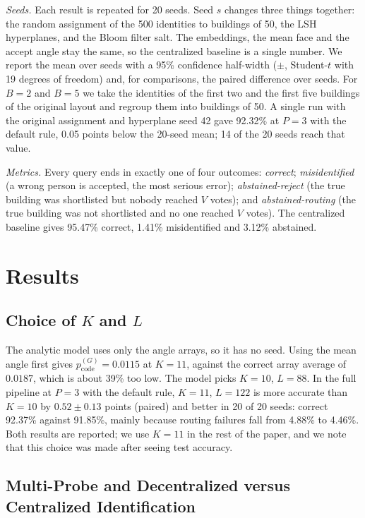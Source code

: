 \documentclass[runningheads]{llncs}
\begin{document}
\emph{Seeds.} Each result is repeated for 20 seeds. Seed $s$ changes three things together: the random assignment of
the 500 identities to buildings of 50, the LSH hyperplanes, and the Bloom filter salt. The embeddings, the mean face
and the accept angle stay the same, so the centralized baseline is a single number. We report the mean over seeds
with a 95\% confidence half-width ($\pm$, Student-$t$ with 19 degrees of freedom) and, for comparisons, the paired
difference over seeds. For $B=2$ and $B=5$ we take the identities of the first two and the first five buildings of
the original layout and regroup them into buildings of 50. A single run with the original assignment and hyperplane
seed 42 gave 92.32\% at $P=3$ with the default rule, 0.05 points below the 20-seed mean; 14
of the 20 seeds reach that value.

\emph{Metrics.} Every query ends in exactly one of four outcomes: \emph{correct}; \emph{misidentified} (a wrong
person is accepted, the most serious error); \emph{abstained-reject} (the true building was shortlisted but nobody
reached $V$ votes); and \emph{abstained-routing} (the true building was not shortlisted and no one reached $V$
votes). The centralized baseline gives 95.47\% correct, 1.41\% misidentified and 3.12\%
abstained.

\section{Results}
\label{sec:results}

\subsection{Choice of $K$ and $L$}
\label{sec:k1011}

The analytic model uses only the angle arrays, so it has no seed. Using the mean angle first gives
$p_{\text{code}}^{(G)}=0.0115$ at $K=11$, against the correct array average of $0.0187$, which is about
39\% too low. The model picks $K=10$, $L=88$. In the full pipeline at $P=3$ with the default rule, $K=11$,
$L=122$ is more accurate than $K=10$ by $0.52 \pm 0.13$ points (paired) and better in 20 of 20 seeds: correct
92.37\% against 91.85\%, mainly because routing failures fall from 4.88\% to 4.46\%. Both
results are reported; we use $K=11$ in the rest of the paper, and we note that this choice was made after seeing test accuracy.

\subsection{Multi-Probe and Decentralized versus Centralized Identification}
\end{document}
